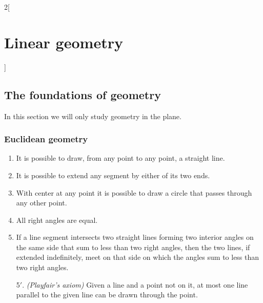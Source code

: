 \documentclass[class=article,10pt,crop=false]{standalone}
\begin{document}
\begin{multicols}{2}[\section{Linear geometry}]
\subsection{The foundations of geometry}
In this section we will only study geometry in the plane.
\subsubsection{Euclidean geometry}
\begin{axiom}
\hfill
    \begin{enumerate}
    \item It is possible to draw, from any point to any point, a straight line.
    \item It is possible to extend any segment by either of its two ends. 
    \item With center at any point it is possible to draw a circle that passes through any other point. 
    \item All right angles are equal.
    \item If a line segment intersects two straight lines forming two interior angles on the same side that sum to less than two right angles, then the two lines, if extended indefinitely, meet on that side on which the angles sum to less than two right angles.
    \item[5$'$.] \textit{(Playfair's axiom)} Given a line and a point not on it, at most one line parallel to the given line can be drawn through the point.
\end{enumerate}
\end{axiom}

\end{multicols}
\end{document}

